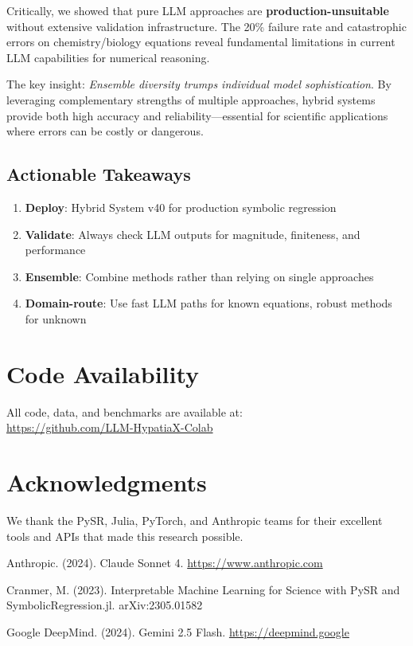 \documentclass[11pt,a4paper]{article}
\begin{document}
Critically, we showed that pure LLM approaches are \textbf{production-unsuitable} without extensive validation infrastructure. The 20\% failure rate and catastrophic errors on chemistry/biology equations reveal fundamental limitations in current LLM capabilities for numerical reasoning.

The key insight: \textit{Ensemble diversity trumps individual model sophistication}. By leveraging complementary strengths of multiple approaches, hybrid systems provide both high accuracy and reliability—essential for scientific applications where errors can be costly or dangerous.

\subsection{Actionable Takeaways}

\begin{enumerate}
    \item \textbf{Deploy}: Hybrid System v40 for production symbolic regression
    \item \textbf{Validate}: Always check LLM outputs for magnitude, finiteness, and performance
    \item \textbf{Ensemble}: Combine methods rather than relying on single approaches
    \item \textbf{Domain-route}: Use fast LLM paths for known equations, robust methods for unknown
\end{enumerate}

\section*{Code Availability}

All code, data, and benchmarks are available at:\\
\url{https://github.com/LLM-HypatiaX-Colab}

\section*{Acknowledgments}

We thank the PySR, Julia, PyTorch, and Anthropic teams for their excellent tools and APIs that made this research possible.

\begin{thebibliferences}

Anthropic. (2024). Claude Sonnet 4. \url{https://www.anthropic.com}

Cranmer, M. (2023). Interpretable Machine Learning for Science with PySR and SymbolicRegression.jl. arXiv:2305.01582

Google DeepMind. (2024). Gemini 2.5 Flash. \url{https://deepmind.google}

\end{thebibliferences}
\end{document}
